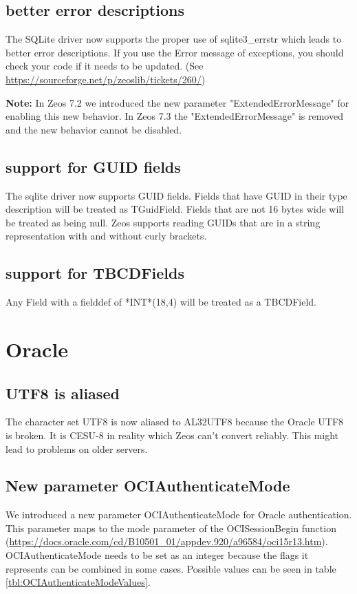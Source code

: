 \documentclass[a4paper,12pt,oneside]{report}
\begin{document}
\subsection{better error descriptions}
The SQLite driver now supports the proper use of sqlite3\_errstr which leads to better error descriptions.
If you use the Error message of exceptions, you should check your code if it needs to be updated.
(See \url{https://sourceforge.net/p/zeoslib/tickets/260/})

\textbf{Note:}
In Zeos 7.2 we introduced the new parameter "ExtendedErrorMessage" for enabling this new behavior.
In Zeos 7.3 the "ExtendedErrorMessage" is removed and the new behavior cannot be disabled.

\subsection{support for GUID fields}
The sqlite driver now supports GUID fields.
Fields that have GUID in their type description will be treated as TGuidField.
Fields that are not 16 bytes wide will be treated as being null.
Zeos supports reading GUIDs that are in a string representation with and without curly brackets.

\subsection{support for TBCDFields}
Any Field with a fielddef of *INT*(18,4) will be treated as a TBCDField.

\section{Oracle}

\subsection{UTF8 is aliased}
The character set UTF8 is now aliased to AL32UTF8 because the Oracle UTF8 is broken.
It is CESU-8 in reality which Zeos can't convert reliably.
This might lead to problems on older servers.

\FloatBarrier
\subsection{New parameter OCIAuthenticateMode}
We introduced a new parameter OCIAuthenticateMode for Oracle authentication.
This parameter maps to the mode parameter of the OCISessionBegin function (\url{https://docs.oracle.com/cd/B10501_01/appdev.920/a96584/oci15r13.htm}).
OCIAuthenticateMode needs to be set as an integer because the flags it represents can be combined in some cases.
Possible values can be seen in table \ref{tbl:OCIAuthenticateModeValues}.
\end{document}
